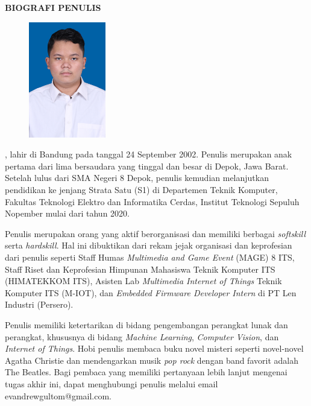 \begin{center}
  \Large
  \textbf{BIOGRAFI PENULIS}
\end{center}


\vspace{2ex}

\begin{figure}
  \centering
  \vspace{-3ex}
  \includegraphics[width=0.3\textwidth]{gambar/evan.jpg}
  \vspace{-4ex}
\end{figure}

\name{}, lahir di Bandung pada tanggal 24 September 2002. Penulis merupakan anak pertama dari lima bersaudara yang tinggal dan besar di Depok, Jawa Barat. Setelah lulus dari SMA Negeri 8 Depok, penulis kemudian melanjutkan pendidikan ke jenjang Strata Satu (S1) di Departemen Teknik Komputer, Fakultas Teknologi Elektro dan Informatika Cerdas, Institut Teknologi Sepuluh Nopember mulai dari tahun 2020. 

Penulis merupakan orang yang aktif berorganisasi dan memiliki berbagai \emph{softskill} serta \emph{hardskill}. Hal ini dibuktikan dari rekam jejak organisasi dan keprofesian dari penulis seperti Staff Humas \emph{Multimedia and Game Event} (MAGE) 8 ITS, Staff Riset dan Keprofesian Himpunan Mahasiswa Teknik Komputer ITS (HIMATEKKOM ITS), Asisten Lab \emph{Multimedia Internet of Things} Teknik Komputer ITS (M-IOT), dan \emph{Embedded Firmware Developer Intern} di PT Len Industri (Persero).

Penulis memiliki ketertarikan di bidang pengembangan perangkat lunak dan perangkat, khususnya di bidang \emph{Machine Learning}, \emph{Computer Vision}, dan \emph{Internet of Things}. Hobi penulis membaca buku novel misteri seperti novel-novel Agatha Christie dan mendengarkan musik \emph{pop rock} dengan band favorit adalah The Beatles. Bagi pembaca yang memiliki pertanyaan lebih lanjut mengenai tugas akhir ini, dapat menghubungi penulis melalui email evandrewgultom@gmail.com.